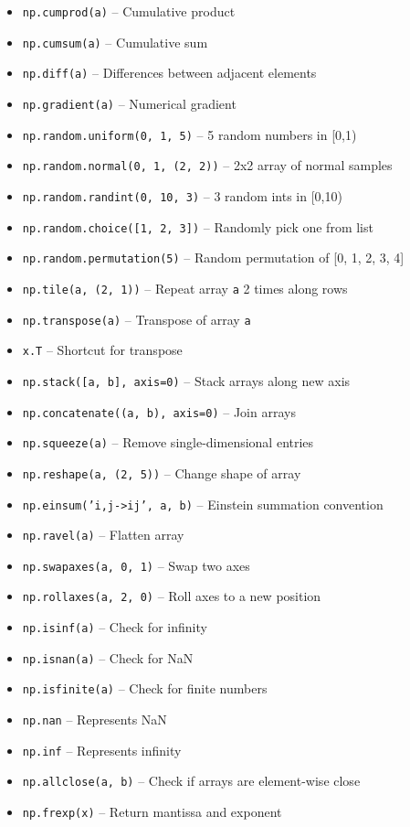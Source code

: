 \documentclass{article}
\begin{document}
\begin{itemize}
    \item \texttt{np.cumprod(a)} -- Cumulative product
    \item \texttt{np.cumsum(a)} -- Cumulative sum
    \item \texttt{np.diff(a)} -- Differences between adjacent elements
    \item \texttt{np.gradient(a)} -- Numerical gradient

    \item \texttt{np.random.uniform(0, 1, 5)} -- 5 random numbers in [0,1)
    \item \texttt{np.random.normal(0, 1, (2, 2))} -- 2x2 array of normal samples
    \item \texttt{np.random.randint(0, 10, 3)} -- 3 random ints in [0,10)
    \item \texttt{np.random.choice([1, 2, 3])} -- Randomly pick one from list
    \item \texttt{np.random.permutation(5)} -- Random permutation of [0, 1, 2, 3, 4]

    \item \texttt{np.tile(a, (2, 1))} -- Repeat array \texttt{a} 2 times along rows
    \item \texttt{np.transpose(a)} -- Transpose of array \texttt{a}
    \item \texttt{x.T} -- Shortcut for transpose
    \item \texttt{np.stack([a, b], axis=0)} -- Stack arrays along new axis
    \item \texttt{np.concatenate((a, b), axis=0)} -- Join arrays
    \item \texttt{np.squeeze(a)} -- Remove single-dimensional entries
    \item \texttt{np.reshape(a, (2, 5))} -- Change shape of array
    \item \texttt{np.einsum('i,j->ij', a, b)} -- Einstein summation convention
    \item \texttt{np.ravel(a)} -- Flatten array
    \item \texttt{np.swapaxes(a, 0, 1)} -- Swap two axes
    \item \texttt{np.rollaxes(a, 2, 0)} -- Roll axes to a new position

    \item \texttt{np.isinf(a)} -- Check for infinity
    \item \texttt{np.isnan(a)} -- Check for NaN
    \item \texttt{np.isfinite(a)} -- Check for finite numbers
    \item \texttt{np.nan} -- Represents NaN
    \item \texttt{np.inf} -- Represents infinity
    \item \texttt{np.allclose(a, b)} -- Check if arrays are element-wise close
    \item \texttt{np.frexp(x)} -- Return mantissa and exponent


\end{itemize}
\end{document}
